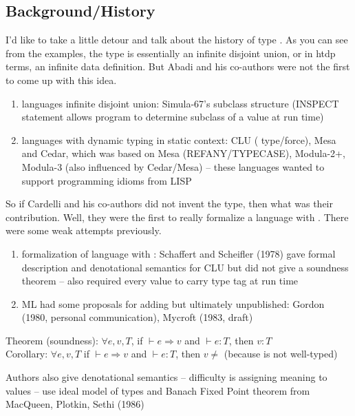 \documentclass[12pt]{article}	%
\begin{document}
\subsection*{Background/History}
I'd like to take a little detour and talk about the history of type \Dynamic. As you can see from the examples, the type \Dynamic is essentially an infinite disjoint union, or in htdp terms, an infinite data definition. But Abadi and his co-authors were not the first to come up with this idea.

\begin{enumerate}
	\item languages infinite disjoint union: Simula-67's subclass structure (INSPECT statement allows program to determine subclass of a value at run time)
	\item languages with dynamic typing in static context: CLU ( type/force), Mesa and Cedar, which was based on Mesa (REFANY/TYPECASE), Modula-2+, Modula-3 (also influenced by Cedar/Mesa) -- these languages wanted to support programming idioms from LISP
\end{enumerate}

So if Cardelli and his co-authors did not invent the \Dynamic type, then what was their contribution. Well, they were the first to really formalize a language with \Dynamic. There were some weak attempts previously.

\begin{enumerate}

	\item formalization of language with \Dynamic: Schaffert and Scheifler (1978) gave formal description and denotational semantics for CLU but did not give a soundness theorem -- also required every value to carry type tag at run time
	\item ML had some proposals for adding \Dynamic but ultimately unpublished: Gordon (1980, personal communication), Mycroft (1983, draft)
\end{enumerate}


Theorem (soundness): $\forall e, v, T$, if $\vdash e \Rightarrow v$ and $\vdash e:T$, then $v:T$\\
	      Corollary: $\forall e, v, T$ if $\vdash e \Rightarrow v$ and $\vdash e:T$, then $v \neq$ \wrong (because \wrong is not well-typed)

Authors also give denotational semantics -- difficulty is assigning meaning to \Dynamic values -- use ideal model of types and Banach Fixed Point theorem from MacQueen, Plotkin, Sethi (1986)
\end{document}
